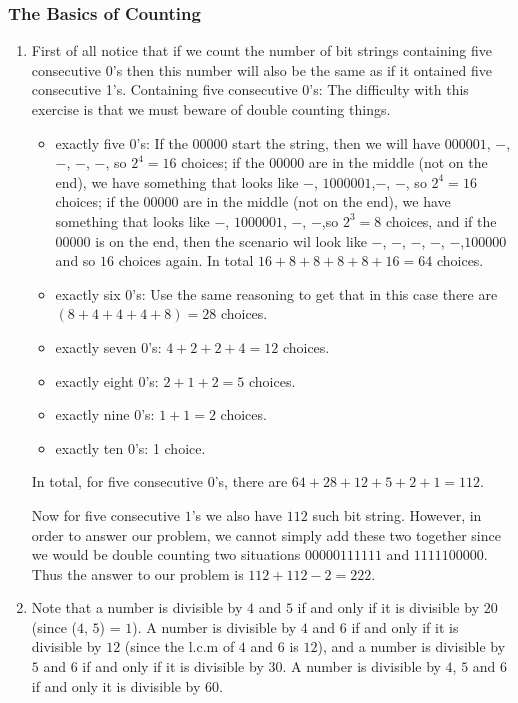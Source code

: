 \documentclass{sig-alternate-05-2015}
\begin{document}
\subsubsection{The Basics of Counting}
\begin{enumerate}
	\item First of all notice that if we count the number of bit strings containing five consecutive 0's then this number will also be the same as if it ontained five consecutive 1's.
		Containing five consecutive $0$'s: The difficulty with this exercise is that we must beware of double counting things.
		\begin{itemize}
			\item exactly five $0$'s: If the $00000$ start the string, then we will have $000001$, $-$, $-$, $-$, $-$, so $2^4=16$ choices; if the $00000$ are in the middle (not on the end), we have something that looks like $-$, $1000001$,$-$, $-$, so $2^4=16$ choices; if the $00000$ are in the middle (not on the end), we have something that looks like $-$, $1000001$, $-$, $-$,so $2^3=8$ choices, and if the $00000$ is on the end, then the scenario wil look like $-$, $-$, $-$, $-$, $-$,$100000$ and so $16$ choices again. In total $16+8+8+8+8+16=64$ choices.
			\item exactly six $0$'s: Use the same reasoning to get that in this case there are $(8+4+4+4+8)=28$ choices.
			\item exactly seven $0$'s: $4+2+2+4=12$ choices.
			\item exactly eight $0$'s: $2+1+2=5$ choices.
			\item exactly nine $0$'s: $1+1=2$ choices.
			\item exactly ten $0$'s: 1 choice.
		\end{itemize}
		
		In total, for five consecutive $0$'s, there are $64+28+12+5+2+1=112$.
		
		Now for five consecutive $1$'s we also have $112$ such bit string. However, in order to answer our problem, we cannot simply add these two together since we would be double counting two situations $00000111111$ and $1111100000$. Thus the answer to our problem is $112+112-2=222$.

	\item Note that a number is divisible by $4$ and $5$ if and only if it
	is divisible by $20$ (since ($4$, $5$) = $1$). A number is divisible by $4$ and $6$
	if and only if it is divisible by $12$ (since the l.c.m of $4$ and $6$ is $12$), and a number is divisible by $5$ and $6$ if and
	only if it is divisible by $30$. A number is divisible by $4$, $5$ and $6$ if and
	only it is divisible by $60$.
	

\end{enumerate}
\end{document}
